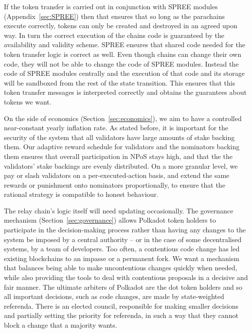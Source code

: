 If the token transfer is carried out in conjunction with SPREE modules (Appendix~\ref{sec:SPREE}) then that ensures that so long as the parachains execute correctly, tokens can only be created and destroyed in an agreed upon way. In turn the correct execution of the chains code is guaranteed by the availability and validity scheme. SPREE ensures that shared code needed for the token transfer logic is correct as well. Even though chains can change their own code, they will not be able to change the code of SPREE modules. Instead the code of SPREE modules centrally and the execution of that code and its storage will be sandboxed from the rest of the state transition. This ensures that this token transfer messages is interpreted correctly and obtains the guarantees about tokens we want. %

On the side of economics (Section~\ref{sec:economics}), we aim to have a controlled near-constant yearly inflation rate. As stated before, it is important for the security of the system that all validators have large amounts of stake backing them. Our adaptive reward schedule for validators and the nominators backing them ensures that overall participation in NPoS stays high, and that the the validators' stake backings are evenly distributed. On a more granular level, we pay or slash validators on a per-executed-action basis, and extend the same rewards or punishment onto nominators proportionally, to ensure that the rational strategy is compatible to honest behaviour.

The relay chain's logic itself will need updating occasionally. The governance mechanism (Section~\ref{sec:governance}) allows Polkadot token holders to participate in the decision-making process rather than having any changes to the system be imposed by a central authority -- or in the case of some decentralised systems, by a team of developers. Too often, a contentious code change has led existing blockchains to an impasse or a permanent fork. 
We want a mechanism that balances being able to make uncontentious changes quickly when needed, while also providing the tools to deal with contentious proposals in a decisive and fair manner. The ultimate arbiters of Polkadot are the dot token holders and so all important decisions, such as code changes, are made by state-weighted referenda. There is an elected council, responsible for making smaller decisions and partially setting the priority for referenda, in such a way that they cannot block a change that a majority wants.

